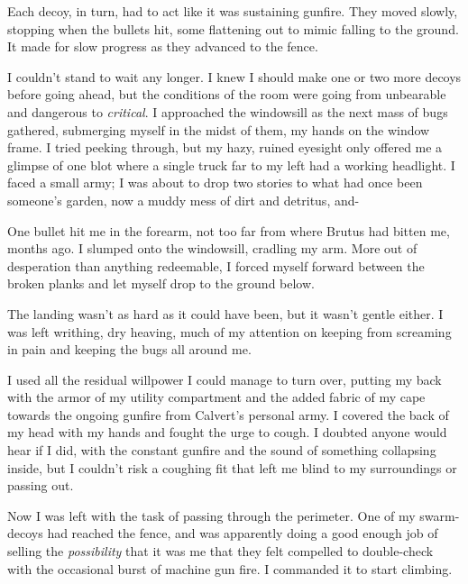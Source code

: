 Each decoy, in turn, had to act like it was sustaining gunfire.  They moved slowly, stopping when the bullets hit, some flattening out to mimic falling to the ground.  It made for slow progress as they advanced to the fence.



I couldn't stand to wait any longer.  I knew I should make one or two more decoys before going ahead, but the conditions of the room were going from unbearable and dangerous to \emph{critical}.  I approached the windowsill as the next mass of bugs gathered, submerging myself in the midst of them, my hands on the window frame.  I tried peeking through, but my hazy, ruined eyesight only offered me a glimpse of one blot where a single truck far to my left had a working headlight.  I faced a small army; I was about to drop two stories to what had once been someone's garden, now a muddy mess of dirt and detritus, and-



One bullet hit me in the forearm, not too far from where Brutus had bitten me, months ago.  I slumped onto the windowsill, cradling my arm.  More out of desperation than anything redeemable, I forced myself forward between the broken planks and let myself drop to the ground below.



The landing wasn't as hard as it could have been, but it wasn't gentle either.  I was left writhing, dry heaving, much of my attention on keeping from screaming in pain and keeping the bugs all around me.



I used all the residual willpower I could manage to turn over, putting my back with the armor of my utility compartment and the added fabric of my cape towards the ongoing gunfire from Calvert's personal army.  I covered the back of my head with my hands and fought the urge to cough.  I doubted anyone would hear if I did, with the constant gunfire and the sound of something collapsing inside, but I couldn't risk a coughing fit that left me blind to my surroundings or passing out.



Now I was left with the task of passing through the perimeter.  One of my swarm-decoys had reached the fence, and was apparently doing a good enough job of selling the \emph{possibility }that it was me that they felt compelled to double-check with the occasional burst of machine gun fire.  I commanded it to start climbing.



